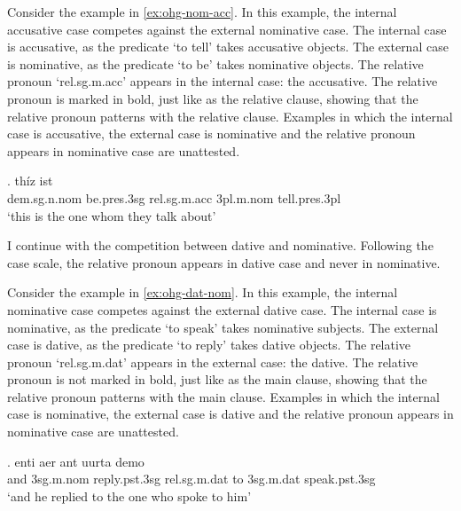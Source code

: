 Consider the example in \ref{ex:ohg-nom-acc}. In this example, the internal accusative case competes against the external nominative case.
The internal case is accusative, as the predicate  `to tell' takes accusative objects.
The external case is nominative, as the predicate  `to be' takes nominative objects.
The relative pronoun  `\ac{rel}.\ac{sg}.\ac{m}.\ac{acc}' appears in the internal case: the accusative. The relative pronoun is marked in bold, just like as the relative clause, showing that the relative pronoun patterns with the relative clause.
Examples in which the internal case is accusative, the external case is nominative and the relative pronoun appears in nominative case are unattested.

\exg. thíz ist   \\
\ac{dem}.\ac{sg}.\ac{n}.\ac{nom} be.\ac{pres}.3\ac{sg}\scsub{[nom]} \ac{rel}.\ac{sg}.\ac{m}.\ac{acc} 3\ac{pl}.\ac{m}.\ac{nom} tell.\ac{pres}.3\ac{pl}\scsub{[acc]}\\
`this is the one whom they talk about' \label{ex:ohg-nom-acc}

I continue with the competition between dative and nominative. Following the case scale, the relative pronoun appears in dative case and never in nominative.

Consider the example in \ref{ex:ohg-dat-nom}. In this example, the internal nominative case competes against the external dative case.
The internal case is nominative, as the predicate  `to speak' takes nominative subjects.
The external case is dative, as the predicate  `to reply' takes dative objects.
The relative pronoun  `\ac{rel}.\ac{sg}.\ac{m}.\ac{dat}' appears in the external case: the dative. The relative pronoun is not marked in bold, just like as the main clause, showing that the relative pronoun patterns with the main clause.
Examples in which the internal case is nominative, the external case is dative and the relative pronoun appears in nominative case are unattested.

\exg. enti aer {ant uurta} demo  \\
and 3\ac{sg}.\ac{m}.\ac{nom} reply.\ac{pst}.3\ac{sg}\scsub{[dat]} \ac{rel}.\ac{sg}.\ac{m}.\ac{dat} {to 3\ac{sg}.\ac{m}.\ac{dat}} speak.\ac{pst}.3\ac{sg}\scsub{[nom]}\\
`and he replied to the one who spoke to him' \label{ex:ohg-dat-nom}

